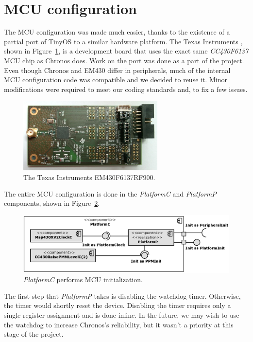 \section{MCU configuration}

The MCU configuration was made much easier, thanks to the existence of a partial port of TinyOS to a similar hardware platform. The Texas Instruments \cite{EM430}, shown in Figure~\ref{fig:em430_board}, is a development board that uses the exact same \emph{CC430F6137} MCU chip as Chronos does. Work on the port was done as a part of the \cite{OSIAN} project. Even though Chronos and EM430 differ in peripherals, much of the internal MCU configuration code was compatible and we decided to reuse it.  Minor modifications were required to meet our coding standards and, to fix a few issues.
\begin{figure}[h]
  \centering
  \includegraphics[width=0.65\textwidth]{img/em430_board.jpg}
  \caption{The Texas Instruments EM430F6137RF900.}
  \label{fig:em430_board}
\end{figure}

The entire MCU configuration is done in the \emph{PlatformC} and \emph{PlatformP} components, shown in Figure~\ref{fig:platformc}.
\begin{figure}[h]
  \centering
  \includegraphics[width=1.0\textwidth]{diagrams/platformc.eps}
  \caption{\emph{PlatformC} performs MCU initialization.}
  \label{fig:platformc}
\end{figure}
The first step that \emph{PlatformP} takes is disabling the watchdog timer. Otherwise, the timer would shortly reset the device. Disabling the timer requires only a single register assignment and is done inline. In the future, we may wish to use the watchdog to increase Chronos's reliability, but it wasn't a priority at this stage of the project.

